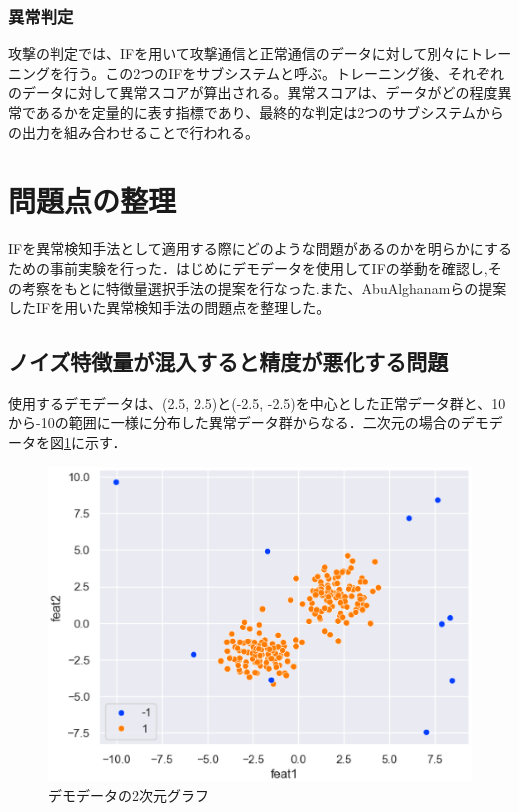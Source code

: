 \documentclass{css}
\begin{document}
\subsubsection{異常判定}

攻撃の判定では、IFを用いて攻撃通信と正常通信のデータに対して別々にトレーニングを行う。この2つのIFをサブシステムと呼ぶ。トレーニング後、それぞれのデータに対して異常スコアが算出される。異常スコアは、データがどの程度異常であるかを定量的に表す指標であり、最終的な判定は2つのサブシステムからの出力を組み合わせることで行われる。


\section{問題点の整理}
IFを異常検知手法として適用する際にどのような問題があるのかを明らかにするための事前実験を行った．はじめにデモデータを使用してIFの挙動を確認し,その考察をもとに特徴量選択手法の提案を行なった.また、AbuAlghanamらの提案したIFを用いた異常検知手法\cite{AbuAlghanam2023-sx}の問題点を整理した。

\subsection{ノイズ特徴量が混入すると精度が悪化する問題}
使用するデモデータは、(2.5, 2.5)と(-2.5, -2.5)を中心とした正常データ群と、10から-10の範囲に一様に分布した異常データ群からなる．二次元の場合のデモデータを図\ref{fig:demodata}に示す．

\begin{figure}[ht]
    \centering
    \includegraphics[width=\linewidth]{pictures/eps/demodata.eps}
    \caption{デモデータの2次元グラフ}
    \label{fig:demodata}
\end{figure}
\end{document}
